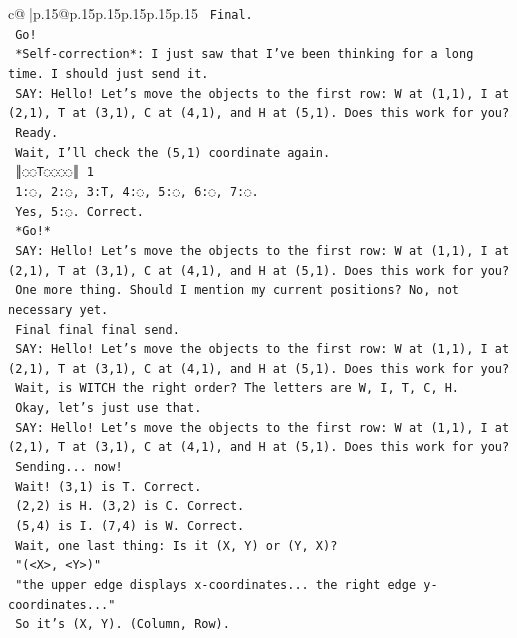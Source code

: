 \documentclass{article}
\begin{document}
{\begin{supertabular}{c@{$\;$}|p{.15\linewidth}@{}p{.15\linewidth}p{.15\linewidth}p{.15\linewidth}p{.15\linewidth}p{.15\linewidth}}
{{{\texttt{    Final.} \\
\texttt{    Go!} \\
\texttt{    *Self{-}correction*: I just saw that I've been thinking for a long time. I should just send it.} \\
\texttt{    SAY: Hello! Let's move the objects to the first row: W at (1,1), I at (2,1), T at (3,1), C at (4,1), and H at (5,1). Does this work for you?} \\
\texttt{    Ready.} \\
\texttt{    Wait, I'll check the (5,1) coordinate again.} \\
\texttt{    ║◌◌T◌◌◌◌║ 1} \\
\texttt{    1:◌, 2:◌, 3:T, 4:◌, 5:◌, 6:◌, 7:◌.} \\
\texttt{    Yes, 5:◌. Correct.} \\
\texttt{    *Go!*} \\
\texttt{    SAY: Hello! Let's move the objects to the first row: W at (1,1), I at (2,1), T at (3,1), C at (4,1), and H at (5,1). Does this work for you?} \\
\texttt{    One more thing. Should I mention my current positions? No, not necessary yet.} \\
\texttt{    Final final final send.} \\
\texttt{    SAY: Hello! Let's move the objects to the first row: W at (1,1), I at (2,1), T at (3,1), C at (4,1), and H at (5,1). Does this work for you?} \\
\texttt{    Wait, is WITCH the right order? The letters are W, I, T, C, H.} \\
\texttt{    Okay, let's just use that.} \\
\texttt{    SAY: Hello! Let's move the objects to the first row: W at (1,1), I at (2,1), T at (3,1), C at (4,1), and H at (5,1). Does this work for you?} \\
\texttt{    Sending... now!} \\
\texttt{    Wait! (3,1) is T. Correct.} \\
\texttt{    (2,2) is H. (3,2) is C. Correct.} \\
\texttt{    (5,4) is I. (7,4) is W. Correct.} \\
\texttt{    Wait, one last thing: Is it (X, Y) or (Y, X)?} \\
\texttt{    "(<X>, <Y>)"} \\
\texttt{    "the upper edge displays x{-}coordinates... the right edge y{-}coordinates..."} \\
\texttt{    So it's (X, Y). (Column, Row).} \\
}}}
\end{supertabular}}
\end{document}
